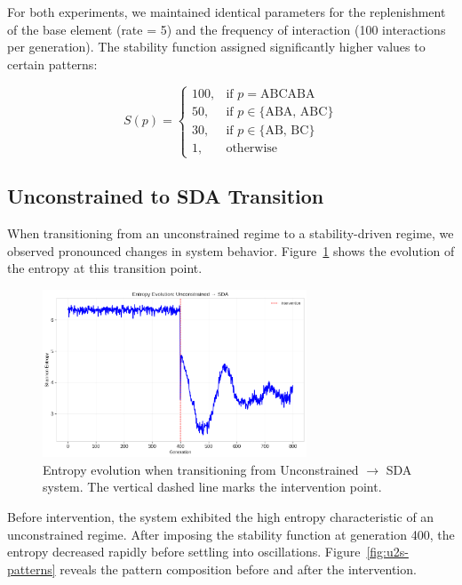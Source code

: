 \documentclass[preprint,12pt]{elsarticle}
\begin{document}
For both experiments, we maintained identical parameters for the replenishment of the base element (rate = 5) and the frequency of interaction (100 interactions per generation). The stability function assigned significantly higher values to certain patterns:

\begin{equation}
S(p) = 
\begin{cases}
100, & \text{if } p = \text{ABCABA} \\
50, & \text{if } p \in \{\text{ABA, ABC}\} \\
30, & \text{if } p \in \{\text{AB, BC}\} \\
1, & \text{otherwise}
\end{cases}
\end{equation}

\subsection{Unconstrained to SDA Transition}

When transitioning from an unconstrained regime to a stability-driven regime, we observed pronounced changes in system behavior. Figure~\ref{fig:u2s-entropy} shows the evolution of the entropy at this transition point.

\begin{figure}[h]
    \centering
    \includegraphics[width=0.7\textwidth]{figure_6.png}
    \caption{Entropy evolution when transitioning from Unconstrained $\to$ SDA system. The vertical dashed line marks the intervention point.}
    \label{fig:u2s-entropy}
\end{figure}

Before intervention, the system exhibited the high entropy characteristic of an unconstrained regime. After imposing the stability function at generation 400, the entropy decreased rapidly before settling into oscillations. Figure~\ref{fig:u2s-patterns} reveals the pattern composition before and after the intervention.
\end{document}
